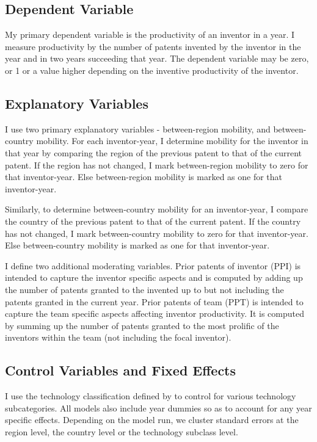 \documentclass[12pt]{article}
\begin{document}
\subsection{Dependent Variable}
My primary dependent variable is the productivity of an inventor in a year.  I measure productivity by the number of patents invented by the inventor in the year and in two years succeeding that year. The dependent variable may be zero, or 1 or a value higher depending on the inventive productivity of the inventor.

\subsection{Explanatory Variables}
I use two primary explanatory variables - between-region mobility, and between-country mobility.  For each inventor-year,  I  determine mobility for the inventor in that year by comparing the region  of the previous patent to that of the current patent. If the region has not changed, I mark between-region mobility to zero for that inventor-year. Else between-region mobility is marked as one for that inventor-year.\par

Similarly, to determine between-country mobility for an inventor-year,  I  compare the country  of the previous patent to that of the current patent. If the country has not changed, I mark between-country mobility to zero for that inventor-year. Else between-country mobility is marked as one for that inventor-year.\par

I define two additional moderating variables. Prior patents of inventor (PPI) is intended to capture the inventor specific aspects and is computed by adding up the number of patents granted to the invented up to but not including the patents granted in the current year. Prior patents of team (PPT) is intended to capture the team specific aspects affecting inventor productivity. It is computed by summing up the number of patents granted to the most prolific of the inventors within the team (not including the focal inventor).

\subsection{Control Variables and Fixed Effects}
I use the technology classification defined by  \cite{Hall2001} to control for various technology subcategories. All models also include  year dummies so as to account for any year specific effects. Depending on the model run, we cluster standard errors at the region level, the country level or the technology subclass level.
\end{document}
